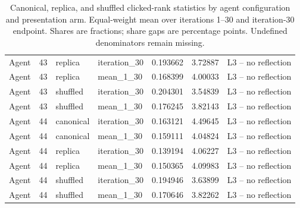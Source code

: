 \begin{table}[htbp!]
\begin{tabular}{lrllrrl}
Agent & 43 & replica & iteration\_30 & 0.193662 & 3.72887 & L3 -- no reflection \\
Agent & 43 & replica & mean\_1\_30 & 0.168399 & 4.00033 & L3 -- no reflection \\
Agent & 43 & shuffled & iteration\_30 & 0.204301 & 3.54839 & L3 -- no reflection \\
Agent & 43 & shuffled & mean\_1\_30 & 0.176245 & 3.82143 & L3 -- no reflection \\
Agent & 44 & canonical & iteration\_30 & 0.163121 & 4.49645 & L3 -- no reflection \\
Agent & 44 & canonical & mean\_1\_30 & 0.159111 & 4.04824 & L3 -- no reflection \\
Agent & 44 & replica & iteration\_30 & 0.139194 & 4.06227 & L3 -- no reflection \\
Agent & 44 & replica & mean\_1\_30 & 0.150365 & 4.09983 & L3 -- no reflection \\
Agent & 44 & shuffled & iteration\_30 & 0.194946 & 3.63899 & L3 -- no reflection \\
Agent & 44 & shuffled & mean\_1\_30 & 0.170646 & 3.82262 & L3 -- no reflection \\
\hline
\end{tabular}
\caption{Canonical, replica, and shuffled clicked-rank statistics by agent configuration and presentation arm. Equal-weight mean over iterations 1--30 and iteration-30 endpoint. Shares are fractions; share gaps are percentage points. Undefined denominators remain missing.}
\label{chap:results:tab:rq3_agents_rank_statistics_by_arm}
\end{table}
